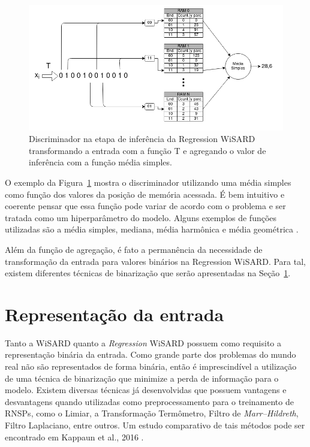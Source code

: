 \begin{figure}[!ht] \label{fig:rew_discr}
    \centering
    \includegraphics[width=5.0in]{img/rew_regression.png}
    \caption{Discriminador na etapa de inferência da Regression WiSARD transformando a entrada com a função T e agregando o valor de inferência com a função média simples.}
\end{figure}

O exemplo da Figura~\ref{fig:rew_discr} mostra o discriminador utilizando uma média simples como função dos valores da posição de memória acessada. É bem intuitivo e coerente pensar que essa função pode variar de acordo com o problema e ser tratada como um hiperparâmetro do modelo. Alguns exemplos de funções utilizadas são a média simples, mediana, média harmônica e média geométrica \cite{rew}.

Além da função de agregação, é fato a permanência da necessidade de transformação da entrada para valores binários na Regression WiSARD. Para tal, existem diferentes técnicas de binarização que serão apresentadas na Seção~\ref{sec:input_repr}.

\section{Representação da entrada} \label{sec:input_repr}
Tanto a WiSARD quanto a \textit{Regression} WiSARD possuem como requisito a representação binária da entrada. Como grande parte dos problemas do mundo real não são representados de forma binária, então é imprescindível a utilização de uma técnica de binarização que minimize a perda de informação para o modelo. Existem diversas técnicas já desenvolvidas que possuem vantagens e desvantagens quando utilizadas como preprocessamento para o treinamento de RNSPs, como o Limiar, a Transformação Termômetro, Filtro de \textit{Marr–Hildreth}, Filtro Laplaciano, entre outros. Um estudo comparativo de tais métodos pode ser encontrado em Kappaun et al., 2016 \cite{binenctec}.

